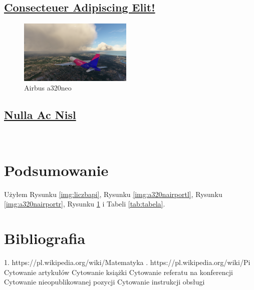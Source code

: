 \documentclass[]{article}
\begin{document}
\newpage
    \subsection{\underline{Consecteuer Adipiscing Elit!}}
    \lipsum[15-19]
   
\begin{figure}
  \centering
  \includegraphics[width=0.48\textwidth]{landing.png}
  \caption{Airbus a320neo}
  \label{img:a320n}
\end{figure}

\newpage
    \subsection{\underline{Nulla Ac Nisl}}
    \lipsum[20-22] \\

\newpage

\section{Podsumowanie}
Użyłem Rysunku \ref{img:liczbapi}, Rysunku \ref{img:a320nairportl}, Rysunku \ref{img:a320nairportr}, Rysunku \ref{img:a320n} i Tabeli \ref{tab:tabela}.



\section{Bibliografia}
1.  https://pl.wikipedia.org/wiki/Matematyka
.  https://pl.wikipedia.org/wiki/Pi
\newline
Cytowanie artykułów \cite{art1,art2}\newline
Cytowanie książki\cite{book1}\newline
Cytowanie referatu na konferencji\cite{conf1}\newline
Cytowanie nieopublikowanej pozycji\cite{unpub1}\newline
Cytowanie instrukcji obsługi\cite{manual1}
\end{document}
